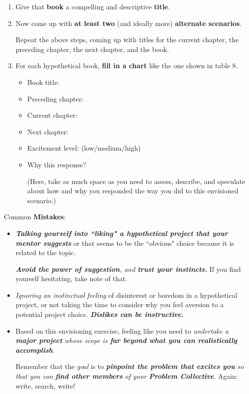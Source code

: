 \documentclass[11pt]{article}
\begin{document}
\begin{itemize}
\begin{exercise}
\begin{enumerate}
\item Give that \textbf{book} a compelling and descriptive \textbf{title}.

\item Now come up with \textbf{at least two} (and ideally more) \textbf{alternate scenarios}. 

Repeat the above steps, coming up with titles for the current chapter, the preceding chapter, the next chapter, and the book.

\item  For each hypothetical book, \textbf{fill in a chart} like the one shown in table 8.
\begin{itemize}
\item Book title:
\item Preceding chapter: 
\item Current chapter:
\item Next chapter: 
\item Excitement level: (low/medium/high)
\item Why this response? 

 (Here, take as much space as you need to assess, describe, and speculate about how and why you responded the way you did to this envisioned scenario.)
\end{itemize}
\end{enumerate}
\end{exercise}
Common \textbf{Mistakes}:
\begin{itemize}
\item  \emph{\textbf{Talking yourself into ``liking" a hypothetical project that your mentor suggests}} or that seems to be the ``obvious" choice because it is related to the topic.

\emph{\textbf{Avoid the power of suggestion}, and \textbf{trust your instincts.}} If you find yourself hesitating, take note of that.

\item  \emph{Ignoring an instinctual feeling} of disinterest or boredom in a hypothetical project, or not taking the time to consider why you feel aversion to a potential project choice. \emph{\textbf{Dislikes can be instructive.}}

\item  Based on this envisioning exercise, feeling like you need to \emph{undertake a \textbf{major project} whose scope is \textbf{far beyond what you can realistically accomplish}}.

Remember that the \emph{goal} is to \emph{\textbf{pinpoint the problem that excites you} so that you can \textbf{find other members} of your \textbf{Problem Collective}}. Again: write,
search, write!
\end{itemize}


\end{itemize}
\end{document}
